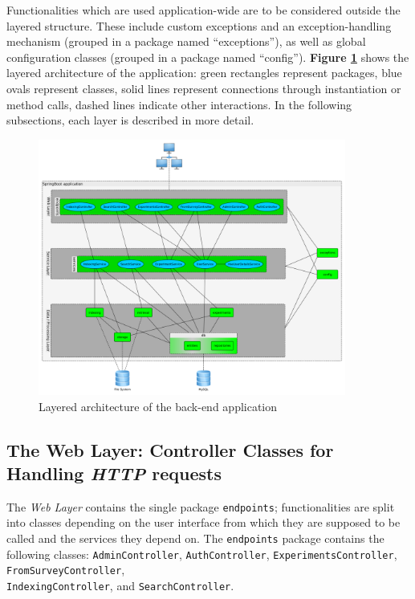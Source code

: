 \documentclass[a4paper]{usiinfbachelorproject}
\begin{document}
Functionalities which are used application-wide are to be considered outside the layered structure. These include
custom exceptions and an exception-handling mechanism (grouped in a package named ``exceptions''), as well as global
configuration classes (grouped in a package named ``config''). \textbf{Figure \ref{fig:archLayers}} shows the
layered architecture of the application: green rectangles represent packages, blue ovals represent classes,
solid lines represent connections through instantiation or method calls, dashed lines indicate other interactions.
In the following subsections, each layer is described in more detail.


\begin{figure}[h!]
\centering
\includegraphics[width=0.9\textwidth]{figures/archLayers}
\caption{Layered architecture of the back-end application}
\label{fig:archLayers}
\end{figure}

\subsection{\textbf{The Web Layer: Controller Classes for Handling \emph{HTTP} requests}} \label{sec:archWebLayer}

The \emph{Web Layer} contains the single package \texttt{endpoints}; functionalities are split into classes depending on the
user interface from which they are supposed to be called and the services they depend on.
The \texttt{endpoints} package contains the following classes:
\texttt{AdminController},
\texttt{AuthController},
\texttt{ExperimentsController},
\texttt{FromSurveyController}, \\
\texttt{IndexingController}, and
\texttt{SearchController}.
\end{document}
